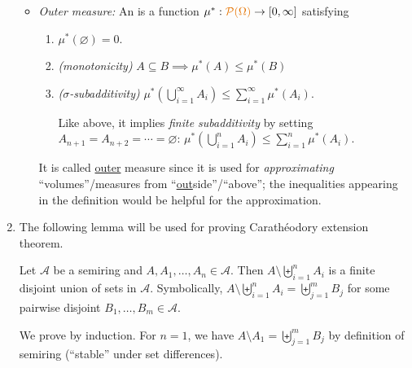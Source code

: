 \begin{enumerate}
\begin{itemize}
\item \emph{Outer measure:} An  is a function
\(\mu^*:\orc{\mathcal{P}(\Omega)}\to[0,\infty]\) satisfying
\begin{enumerate}[label={(\arabic*)}]
\item \(\mu^*(\varnothing)=0\).
\item \emph{(monotonicity)} \(A\subseteq B\implies \mu^*(A)\le\mu^*(B)\)
\item \emph{(\(\sigma\)-subadditivity)} \(\mu^*(\bigcup_{i=1}^{\infty}A_i)\le\sum_{i=1}^{\infty}\mu^*(A_i)\).
\begin{note}
Like above, it implies \emph{finite subadditivity} by setting
\(A_{n+1}=A_{n+2}=\dotsb=\varnothing\):
\(\mu^*(\bigcup_{i=1}^{n}A_i)\le\sum_{i=1}^{n}\mu^*(A_i)\).
\end{note}
\end{enumerate}
It is called \underline{outer} measure since it is used for
\emph{approximating} ``volumes''/measures from
``\underline{out}side''/``above''; the inequalities appearing in the definition
would be helpful for the approximation.
\end{itemize}
\item The following lemma will be used for proving Carath\'eodory extension
theorem.
\begin{lemma}
\label{lma:diff-mult-sets}
Let \(\mathcal{A}\) be a semiring and \(A,A_1,\dotsc,A_n\in\mathcal{A}\). Then
\(A\setminus\biguplus_{i=1}^{n}A_i\) is a finite disjoint union of sets in
\(\mathcal{A}\). Symbolically, \(A\setminus\biguplus_{i=1}^{n}A_i
=\biguplus_{j=1}^{m}B_j\) for some
pairwise disjoint \(B_1,\dotsc,B_m\in\mathcal{A}\).
\end{lemma}
\begin{pf}
We prove by induction. For \(n=1\), we have \(A\setminus
A_1=\biguplus_{j=1}^{m}B_j\) by definition of semiring (``stable'' under set differences).


\end{pf}
\end{enumerate}
